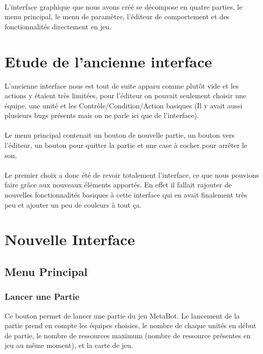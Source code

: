 \documentclass{report}
\begin{document}
\paragraph{}
L'interface graphique que nous avons créé se décompose en quatre parties, le menu principal, le menu de paramètre, l'éditeur de comportement et des fonctionnalités directement en jeu.
\section{Etude de l'ancienne interface}
L'ancienne interface nous est tout de suite apparu comme plutôt vide et les actions y étaient très limitées, pour l'éditeur on pouvait seulement choisir une équipe, une unité et les Contrôle/Condition/Action basiques (Il y avait aussi plusieurs bugs présents mais on ne parle ici que de l'interface).
\paragraph{}
Le menu principal contenait un bouton de nouvelle partie, un bouton vers l'éditeur, un bouton pour quitter la partie et une case à cocher pour arrêter le son.
\paragraph{}
\paragraph{}
Le premier choix a donc été de revoir totalement l'interface, ce que nous pouvions faire grâce aux nouveaux éléments apportés. En effet il fallait rajouter de nouvelles fonctionnalités basiques à cette interface qui en avait finalement très peu et ajouter un peu de couleurs à tout ça.
\section{Nouvelle Interface}

\subsection{Menu Principal}
\subsubsection{Lancer une Partie}
Ce bouton permet de lancer une partie du jeu MetaBot. Le lancement de la partie prend en compte les équipes choisies, le nombre de chaque unités en début de partie, le nombre de ressources maximum (nombre de ressource présentes en jeu au même moment), et la carte de jeu.
\end{document}
